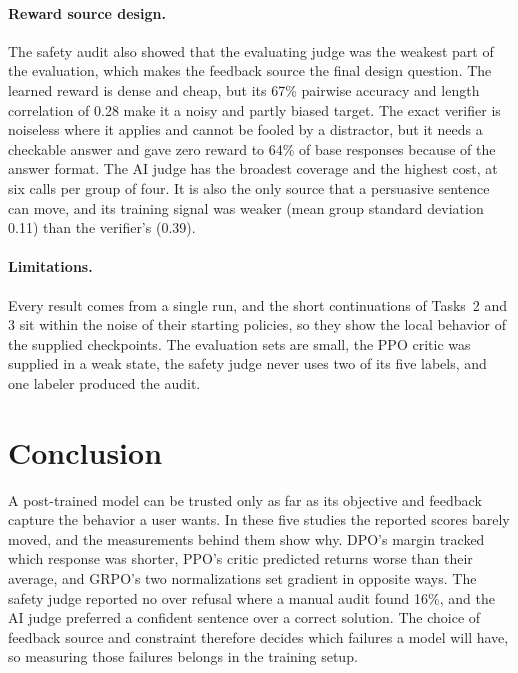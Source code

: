 \documentclass{article}
\begin{document}
\paragraph{Reward source design.}
The safety audit also showed that the evaluating judge was the weakest part
of the evaluation, which makes the feedback source the final design question. The
learned reward is dense and cheap, but its 67\% pairwise accuracy and length
correlation of 0.28 make it a noisy and partly biased target. The exact verifier
is noiseless where it applies and cannot be fooled by a distractor, but it needs
a checkable answer and gave zero reward to 64\% of base responses because of the
answer format. The AI judge has the broadest coverage and the highest cost, at
six calls per group of four. It is also the only source that a persuasive
sentence can move, and its training signal was weaker (mean group standard
deviation 0.11) than the verifier's (0.39).

\paragraph{Limitations.}
Every result comes from a single run, and the short continuations of Tasks~2 and
3 sit within the noise of their starting policies, so they show the local
behavior of the supplied checkpoints. The evaluation sets are small, the PPO
critic was supplied in a weak state, the safety judge never uses two of its five
labels, and one labeler produced the audit.

\section{Conclusion}
\label{sec:conclusion}

A post-trained model can be trusted only as far as its objective and feedback
capture the behavior a user wants. In these five studies the reported scores
barely moved, and the measurements behind them show why. DPO's
margin tracked which response was shorter, PPO's critic predicted returns
worse than their average, and GRPO's two normalizations set gradient in opposite ways.
The safety judge reported no over refusal where a manual audit found 16\%, and
the AI judge preferred a confident sentence over a correct solution. The choice
of feedback source and constraint therefore decides which failures a model will
have, so measuring those failures belongs in the training setup.

\clearpage




\end{document}
